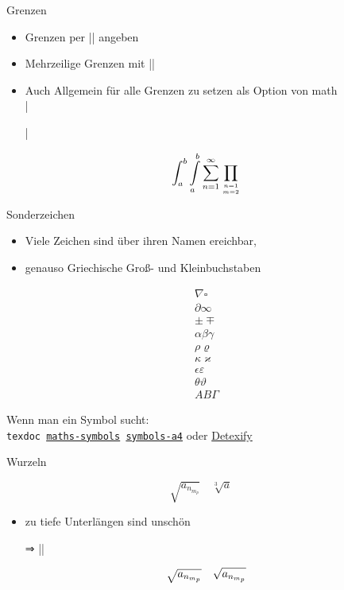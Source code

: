 \documentclass[
	vorläufig=false,
	datum=2021-11-03,
	titel={Mathematiksatz I},
	web=false,
	max,
	aspectratio=1610,
]{../tex/latexkurs-slides}
\begin{document}
\begin{frame}[fragile]{Grenzen}
\begin{itemize}
\item Grenzen per |\limits| angeben
\item Mehrzeilige Grenzen mit |\atop|
\item Auch Allgemein für alle Grenzen zu setzen als Option von \AmS math\\
        |\usepackage[intlimits,sumlimits]{amsmath}|
\end{itemize}
\vspace{1em}
\begin{LTXexample}
\[
  \int_a^b
  \int\limits_a^b
  \sum_{n=1}^\infty
  \prod_{n = 1 \atop m = 2}
\]
\end{LTXexample}
\end{frame}

\begin{frame}[fragile]{Sonderzeichen}
\begin{itemize}
\item Viele Zeichen sind über ihren Namen ereichbar,
\item genauso Griechische Groß- und Kleinbuchstaben
\end{itemize}
\begin{LTXexample}[preset=\vspace{-1em}]
\begin{align*}
  \nabla \square \\ 
  \partial \infty \\
  \pm \mp \\
  \alpha \beta \gamma \\
  \rho \varrho \\
  \kappa \varkappa \\
  \epsilon \varepsilon \\
  \theta \vartheta \\
   A B \Gamma 
\end{align*}
\end{LTXexample}
\pause
Wenn man ein Symbol sucht:\\
\texttt{texdoc \href{http://mirrors.ctan.org/info/symbols/math/maths-symbols.pdf}{maths-symbols} \href{http://mirrors.ctan.org/info/symbols/comprehensive/symbols-a4.pdf}{symbols-a4}}
oder \alert{\href{http://detexify.kirelabs.org/classify.html}{Detexify}}
\end{frame}

\begin{frame}[fragile]{Wurzeln}
\begin{LTXexample}[preset=\Large]
\[
  \sqrt{a_{n_{m_p}}}
  \quad
  \sqrt[3]{a}\quad
\]
\end{LTXexample}
\pause
\begin{itemize}
\item zu tiefe Unterlängen sind unschön \item[⇒] ||
\end{itemize}
\begin{LTXexample}[preset=\Large]
\[
  \sqrt{a_{n_{m_p}}}
  \quad
  \sqrt{
    \smash[b]{
      a_{n_{m_p}}
    }
  }
\]
\end{LTXexample}
\end{frame}
\end{document}
